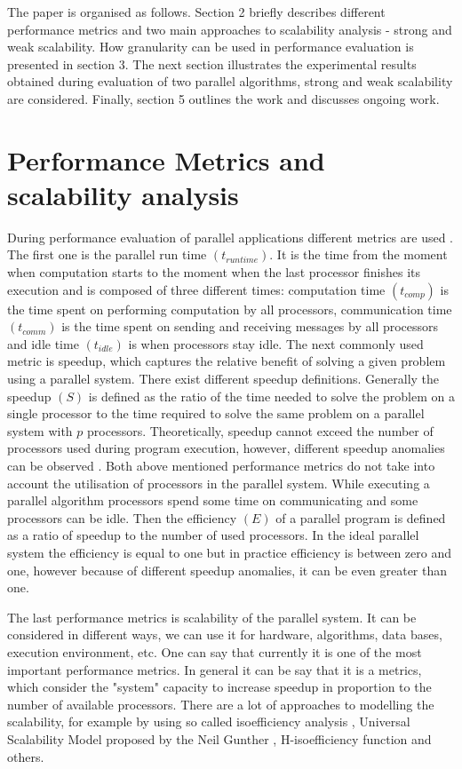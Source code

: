 \documentclass[runningheads]{llncs}
\begin{document}
The paper is organised as follows. Section 2 briefly describes
different performance metrics and two main approaches to scalability analysis - strong and weak scalability. How  granularity can be used in performance evaluation is presented in section 3. The next section illustrates the experimental results obtained during evaluation of two parallel algorithms, strong and weak scalability are considered. Finally, section 5 outlines the work and discusses ongoing work. 

\section{Performance Metrics and scalability analysis}

During performance evaluation of parallel applications different metrics are used \cite{grama}. The first one is the parallel run time $(t_{runtime})$. It is the time from the moment when computation starts to
the moment when the last processor finishes its execution and is composed of three different times: computation time $(t_{comp})$ is the time spent on performing computation by all processors, communication time $(t_{comm})$ is the time spent on sending and receiving messages by all processors and idle time $(t_{idle})$ is when processors stay idle. The next commonly used metric is speedup, which captures the relative benefit of solving a given problem using a parallel system. There exist different speedup definitions. Generally the speedup $(S)$ is defined as the ratio of the time needed to solve the problem on a single processor to the time required to solve the same problem on a parallel system with $p$ processors. Theoretically, speedup
cannot exceed the number of processors used during program execution, however, different speedup anomalies can be observed \cite{kwiatkowski_1}. Both above mentioned performance metrics do not take into account the utilisation of processors in the parallel system. While executing a parallel algorithm processors spend some time on communicating and some processors can be idle. Then the efficiency $(E)$ of a parallel program is defined as a ratio of speedup to the number of used processors. In the ideal parallel system the efficiency
is equal to one but in practice efficiency is between zero and
one, however because of different speedup anomalies, it can be even 
greater than one. 

The last performance metrics is scalability of the parallel system. It can be considered in different ways, we can  use it for hardware, algorithms, data bases, execution environment, etc.  One can say that currently it is one of the most important performance metrics. In general it can be say that it is a metrics, which consider the "system" capacity to increase speedup in proportion to the number of available processors. There are a lot of approaches to modelling the scalability, for example by using so called isoefficiency analysis \cite{grama}, Universal Scalability Model proposed by the Neil Gunther \cite{gunther}, H-isoefficiency function \cite{bosque} and others. 
\end{document}
